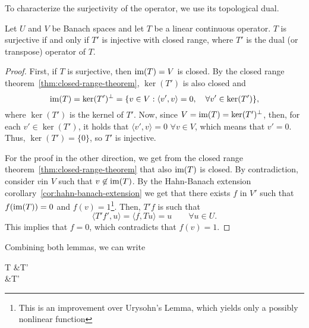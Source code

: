 To characterize the surjectivity of the operator, we use its topological dual.
\begin{lemma}
    Let $U$ and $V$ be Banach spaces and let $T$ be a linear continuous operator. $T$ is surjective if and only if $T'$ is injective with closed range, where $T'$ is the dual (or transpose) operator of $T$.
    \begin{proof}
        First, if $T$ is surjective, then $\operatorname{\text{im}} (T) = V$ is closed. By the closed range theorem~\ref{thm:closed-range-theorem}, $\ker(T')$ is also closed and 
        \begin{equation}
            \operatorname{\text{im}} (T) = \ker (T')^\bot = 
            \{v\in V: \langle v', v\rangle = 0,\quad \forall v' \in \ker(T')\},
        \end{equation}
        where $\ker(T')$ is the kernel of $T'$. Now, since $V = \operatorname{\text{im}}(T) = \ker(T')^\bot$, then, for each $v' \in \ker(T')$, it holds that $ \langle v', v\rangle = 0$ $\forall v \in V$, which means that $v' = 0$. Thus, $\ker(T') = \{0\}$, so $T'$ is injective.

        For the proof in the other direction, we get from the closed range theorem~\ref{thm:closed-range-theorem} that also $\operatorname{\text{im}}(T)$ is closed. By contradiction, consider $v$in $V$ such that $v\not\in \operatorname{\text{im}}(T)$. By the Hahn-Banach extension corollary~\ref{cor:hahn-banach-extension} we get that there exists $f$ in $V'$ such that $f(\operatorname{\text{im}}(T)) = 0$ and $f(v)=1$\footnote{This is an improvement over Urysohn's Lemma, which yields only a possibly nonlinear function}. Then, $T'f$ is such that
        \begin{equation*}
            \langle T'f', u\rangle = \langle f, Tu\rangle = u \qquad \forall u\in U.
        \end{equation*}
        This implies that $f=0$, which contradicts that $f(v)=1$. 
    \end{proof}
\end{lemma}
Combining both lemmas, we can write
\begin{tightalign*}
    T 
    &\Longleftrightarrow T'
    \\&\Longleftrightarrow T'
\end{tightalign*}

